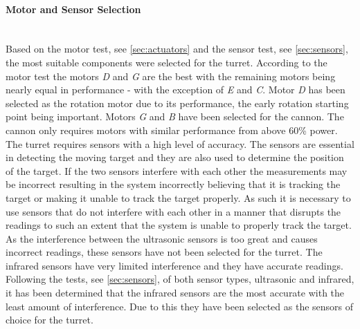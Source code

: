 \paragraph{Motor and Sensor Selection} ~\\
Based on the motor test, see \cref{sec:actuators} and the sensor test, see \cref{sec:sensors}, the most suitable components were selected for the turret. According to the motor test the motors \textit{D} and \textit{G} are the best with the remaining motors being nearly equal in performance - with the exception of \textit{E} and \textit{C}. Motor \textit{D} has been selected as the rotation motor due to its performance, the early rotation starting point being important. Motors \textit{G} and \textit{B} have been selected for the cannon. The cannon only requires motors with similar performance from above 60\% power. \\

The turret requires sensors with a high level of accuracy. The sensors are essential in detecting the moving target and they are also used to determine the position of the target. If the two sensors interfere with each other the measurements may be incorrect resulting in the system incorrectly believing that it is tracking the target or making it unable to track the target properly. As such it is necessary to use sensors that do not interfere with each other in a manner that disrupts the readings to such an extent that the system is unable to properly track the target. As the interference between the ultrasonic sensors is too great and causes incorrect readings, these sensors have not been selected for the turret. The infrared sensors have very limited interference and they have accurate readings. Following the tests, see \cref{sec:sensors}, of both sensor types, ultrasonic and infrared, it has been determined that the infrared sensors are the most accurate  with the least amount of interference. Due to this they have been selected as the sensors of choice for the turret. 








